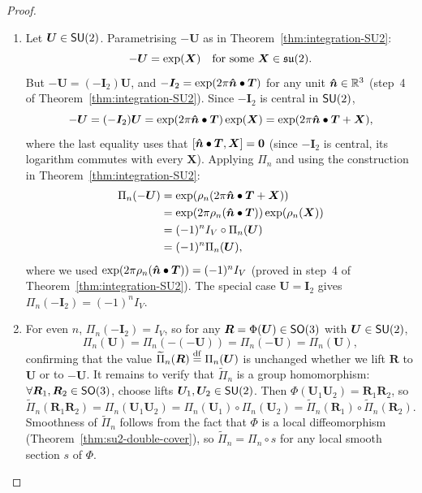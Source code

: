 \documentclass[11pt,reqno]{amsart}
\begin{document}
\begin{proof}
\begin{enumerate}
\item Let $\bm U\in\operatorname{\mathsf{SU}}(2)$.
Parametrising $-\bm U$ as in
Theorem~\ref{thm:integration-SU2}:
\[
-\bm U=\exp\Br{\bm X}\quad\text{for some }\bm X\in\su(2).
\]
But $-\bm U=(-\bm I_2)\bm U$,
and $-\bm I_2=\exp\Br{2\pi\bm{\hat n}\bullet\bm T}$ for any unit
$\bm{\hat n}\in\mathbb{R}^3$ (step~4 of
Theorem~\ref{thm:integration-SU2}).
Since $-\bm I_2$ is central in $\operatorname{\mathsf{SU}}(2)$,
\[
-\bm U=(-\bm I_2)\bm U
=\exp\Br{2\pi\bm{\hat n}\bullet\bm T}\exp\Br{\bm X}
=\exp\Br{2\pi\bm{\hat n}\bullet\bm T+\bm X},
\]
where the last equality uses that $\SqBr{\bm{\hat n}\bullet\bm T,\bm X}=\bm0$
(since $-\bm I_2$ is central, its logarithm commutes with every
$\bm X$).
Applying $\Pi_n$ and using the construction in
Theorem~\ref{thm:integration-SU2}:
\[
\begin{aligned}
\Pi_n(-\bm U)
&=\exp\Br{\rho_n\Br{2\pi\bm{\hat n}\bullet\bm T+\bm X}} \\
&=\exp\Br{2\pi\rho_n\Br{\bm{\hat n}\bullet\bm T}}
\exp\Br{\rho_n(\bm X)} \\
&=(-1)^n I_V\circ\Pi_n(\bm U) \\
&=(-1)^n\Pi_n(\bm U),
\end{aligned}
\]
where we used
$\exp\Br{2\pi\rho_n\Br{\bm{\hat n}\bullet\bm T}}=(-1)^n I_V$
(proved in step~4 of
Theorem~\ref{thm:integration-SU2}).
The special case $\bm U=\bm I_2$ gives $\Pi_n(-\bm I_2)=(-1)^n I_V$.

\item For even $n$, $\Pi_n(-\bm I_2)=I_V$, so for any
$\bm R=\Phi(\bm U)\in\operatorname{\mathsf{SO}}(3)$ with $\bm U\in\operatorname{\mathsf{SU}}(2)$,
\[
\Pi_n(\bm U)=\Pi_n(-(-\bm U))=\Pi_n(-\bm U)=\Pi_n(\bm U),
\]
confirming that the value $\widetilde{\Pi}_n(\bm R)\stackrel{\mathrm{df}}{=}\Pi_n(\bm U)$
is unchanged whether we lift $\bm R$ to $\bm U$ or to $-\bm U$.
It remains to verify that $\widetilde{\Pi}_n$ is a group
homomorphism:
$\forall\bm R_1,\bm R_2\in\operatorname{\mathsf{SO}}(3)$,
choose lifts $\bm U_1,\bm U_2\in\operatorname{\mathsf{SU}}(2)$.
Then $\Phi(\bm U_1\bm U_2)=\bm R_1\bm R_2$, so
\[
\widetilde{\Pi}_n(\bm R_1\bm R_2)
=\Pi_n(\bm U_1\bm U_2)
=\Pi_n(\bm U_1)\circ\Pi_n(\bm U_2)
=\widetilde{\Pi}_n(\bm R_1)\circ\widetilde{\Pi}_n(\bm R_2).
\]
Smoothness of $\widetilde{\Pi}_n$ follows from the fact that $\Phi$
is a local diffeomorphism (Theorem~\ref{thm:su2-double-cover}),
so $\widetilde{\Pi}_n=\Pi_n\circ s$ for any local smooth section
$s$ of $\Phi$.


\end{enumerate}
\end{proof}
\end{document}
